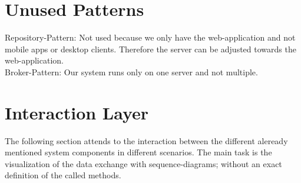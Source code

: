 \documentclass{book}
\begin{document}
\chapter{Unused Patterns}
Repository-Pattern: Not used because we only have the web-application and not mobile apps or desktop clients. Therefore the server can be adjusted towards the web-application.\\
Broker-Pattern: Our system runs only on one server and not multiple.
\chapter{Interaction Layer}
The following section attends to the interaction between the different aleready mentioned system components in different scenarios. The main task is the visualization of the data exchange with sequence-diagrams; without an exact definition of the called methods.
 
\end{document}
